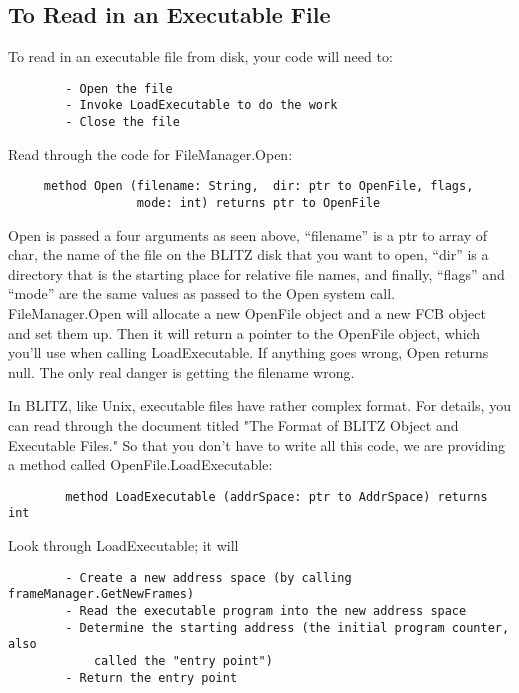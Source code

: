 \documentclass[12pt]{article}
\begin{document}
\subsection{To Read in an Executable File}

To read in an executable file from disk, your code will need to:

\begin{verbatim}
        - Open the file
        - Invoke LoadExecutable to do the work
        - Close the file
\end{verbatim}

Read through the code for FileManager.Open:

\begin{verbatim}
     method Open (filename: String,  dir: ptr to OpenFile, flags,
                  mode: int) returns ptr to OpenFile
\end{verbatim}

Open is passed a four arguments as seen above, ``filename'' is a ptr
to array of char, the name of the file on the BLITZ disk that you want
to open, ``dir'' is a directory that is the starting place for
relative file names, and finally, ``flags'' and ``mode'' are the same
values as passed to the Open system call.  FileManager.Open will
allocate a new OpenFile object and a new FCB object and set them up.
Then it will return a pointer to the OpenFile object, which you'll use
when calling LoadExecutable.  If anything goes wrong, Open returns
null.  The only real danger is getting the filename wrong.

In BLITZ, like Unix, executable files have rather complex format.  For
details, you can read through the document titled "The Format of BLITZ
Object and Executable Files."  So that you don't have to write all
this code, we are providing a method called OpenFile.LoadExecutable:

\begin{verbatim}
        method LoadExecutable (addrSpace: ptr to AddrSpace) returns int
\end{verbatim}

Look through LoadExecutable; it will

\begin{verbatim}
        - Create a new address space (by calling frameManager.GetNewFrames)
        - Read the executable program into the new address space
        - Determine the starting address (the initial program counter, also 
            called the "entry point")
        - Return the entry point
\end{verbatim}
\end{document}
